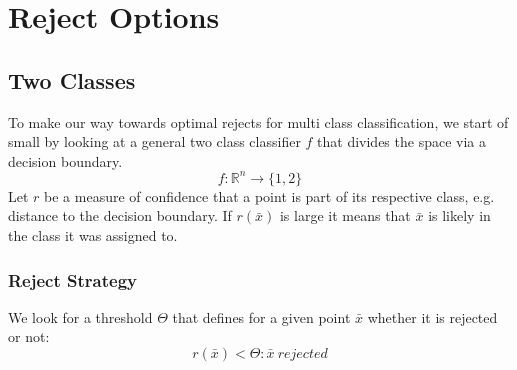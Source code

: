 %
\chapter{Reject Options}
\label{sec:options}

\section{Two Classes}
\label{twoclasses}
To make our way towards optimal rejects for multi class classification, we start of small by looking at a general two class classifier $f$ that divides the space via a decision boundary. 
$$ f: \mathbb{R}^n \to \{1,2\} $$
Let $r$ be a measure of confidence that a point is part of its respective class, e.g. distance to the decision boundary. If $r(\bar{x})$ is large it means that $\bar{x}$ is likely in the class it was assigned to.

\subsection{Reject Strategy}
We look for a threshold $\Theta$ that defines for a given point $\bar{x}$ whether it is rejected or not:
$$ r(\bar{x}) < \Theta : \bar{x} \  rejected $$

